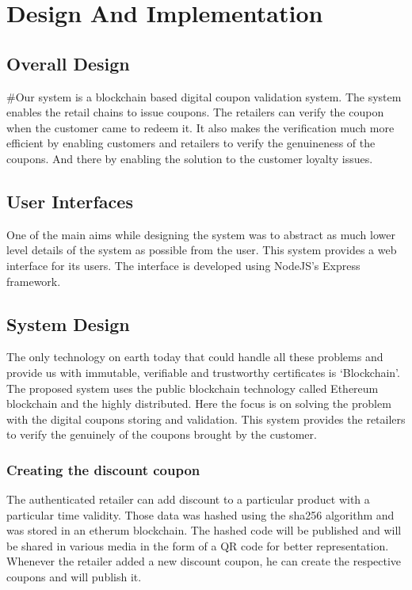\chapter{Design And Implementation}

\section{Overall Design}
\par
#Our system is a blockchain based digital coupon validation system. The system
enables the retail chains to issue coupons. The retailers can verify the coupon
when the customer came to redeem it. It also makes the verification much more
efficient by enabling customers and retailers to verify the genuineness of the coupons. And there by enabling the solution to the customer loyalty issues.

\section{User Interfaces}
One of the main aims while designing the
system was to abstract as much lower level details of the system as possible
from the user. This system provides a web interface for its users. The interface is developed using NodeJS's Express framework.

\section{System Design}
\par
The only technology on earth today that could handle all these problems and provide us with immutable, verifiable and trustworthy certificates is ‘Blockchain’. The proposed system uses the public blockchain technology called Ethereum blockchain and the highly distributed. Here the focus is on solving the problem with the digital coupons storing and validation. This system provides the retailers to verify the genuinely of the coupons brought by the customer.
\subsection{Creating the discount coupon}
The authenticated retailer can add discount to a particular product with a particular time validity. Those data was hashed using the sha256 algorithm and was stored in an etherum blockchain.
The hashed code will be published and will be shared in various media in the form of a QR code for better representation. Whenever the retailer added a new discount coupon, he can create the respective coupons and will publish it. 

